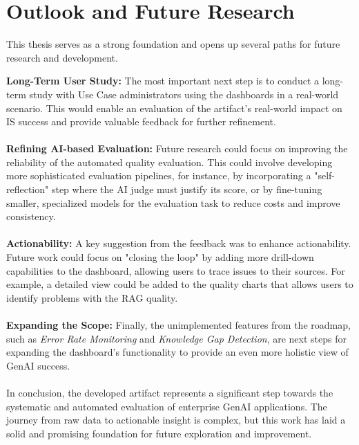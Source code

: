 \documentclass[
	english,
	ruledheaders=section,%
	class=report,%
	thesis={type=bachelor},%
	accentcolor=1b,%
	custommargins=true,%
	marginpar=false,%
	parskip=half-,%
	fontsize=11pt,%
	DIV=14,
]{tudapub}
\begin{document}
\section{Outlook and Future Research}
This thesis serves as a strong foundation and opens up several paths for future research and development.

\textbf{Long-Term User Study:} The most important next step is to conduct a long-term study with Use Case administrators using the dashboards in a real-world scenario. This would enable an evaluation of the artifact's real-world impact on IS success and provide valuable feedback for further refinement.\\
\\
\textbf{Refining AI-based Evaluation:} Future research could focus on improving the reliability of the automated quality evaluation. This could involve developing more sophisticated evaluation pipelines, for instance, by incorporating a "self-reflection" step where the AI judge must justify its score, or by fine-tuning smaller, specialized models for the evaluation task to reduce costs and improve consistency.\\
\\
\textbf{Actionability:} A key suggestion from the feedback was to enhance actionability. Future work could focus on "closing the loop" by adding more drill-down capabilities to the dashboard, allowing users to trace issues to their sources. For example, a detailed view could be added to the quality charts that allows users to identify problems with the RAG quality.\\
\\
\textbf{Expanding the Scope:} Finally, the unimplemented features from the roadmap, such as \textit{Error Rate Monitoring} and \textit{Knowledge Gap Detection}, are next steps for expanding the dashboard's functionality to provide an even more holistic view of GenAI success.\\
\\
In conclusion, the developed artifact represents a significant step towards the systematic and automated evaluation of enterprise GenAI applications. The journey from raw data to actionable insight is complex, but this work has laid a solid and promising foundation for future exploration and improvement.

\end{document}
